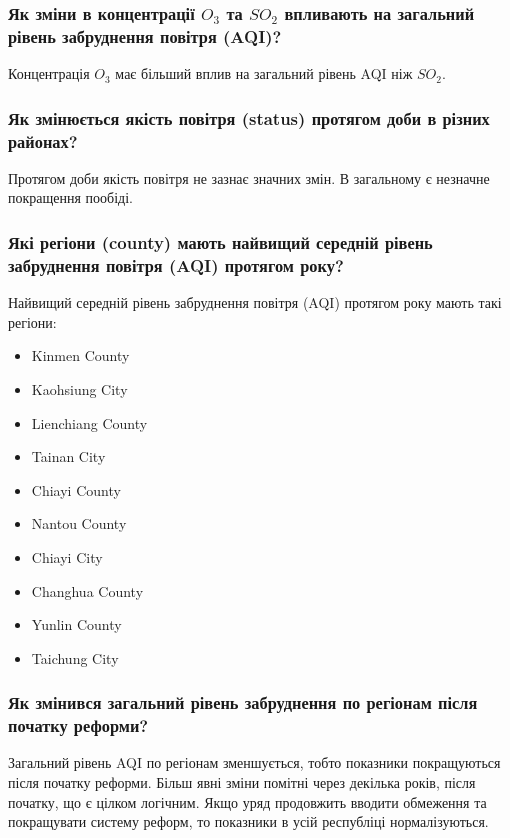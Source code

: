 \documentclass{beamer}
\begin{document}
\begin{frame}
  \frametitle{Як зміни в концентрації  $O_3$  та $SO_2$ впливають на загальний рівень забруднення повітря (AQI)?}

  Концентрація $O_3$ має більший вплив на загальний рівень AQI ніж $SO_2$.
\end{frame}

\begin{frame}
  \frametitle{Як змінюється якість повітря (status) протягом доби в різних районах?}

  Протягом доби якість повітря не зазнає значних змін. В загальному є незначне покращення пообіді.

\end{frame}

\begin{frame}
  \frametitle{Які регіони (county) мають найвищий середній рівень забруднення повітря (AQI) протягом року?}

  Найвищий середній рівень забруднення повітря (AQI) протягом року мають такі регіони: 
  \begin{multicols}{2}
    \begin{itemize}
        \item Kinmen County
        \item Kaohsiung City
        \item Lienchiang County
        \item Tainan City
        \item Chiayi County
        \item Nantou County
        \item Chiayi City
        \item Changhua County
        \item Yunlin County
        \item Taichung City
    \end{itemize}
  \end{multicols} 

\end{frame}

\begin{frame}
  \frametitle{Як змінився загальний рівень забруднення по регіонам після початку реформи?}

  Загальний рівень AQI по регіонам зменшується, тобто показники покращуються після початку реформи.
  Більш явні зміни помітні через декілька років, після початку, що є цілком логічним. 
  Якщо уряд продовжить вводити обмеження та покращувати систему реформ, то показники в усій республіці нормалізуються. 

\end{frame}
\end{document}
